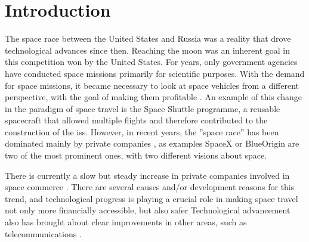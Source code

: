 
\chapter{Introduction}
\label{chapter:introduction}

The space race between the United States and Russia was a reality that drove technological advances since then. Reaching the moon was an inherent goal in this competition won by the United States. For years, only government agencies have conducted space missions primarily for scientific purposes. With the demand for space missions, it became necessary to look at space vehicles from a different perspective, with the goal of making them profitable \cite{gomes_road_2013}. An example of this change in the paradigm of space travel is the Space Shuttle programme, a reusable spacecraft that allowed multiple flights and therefore contributed to the construction of the \gls{iss}. However, in recent years, the ”space race” has been dominated mainly by private companies \cite{gomes_road_2013}, as examples SpaceX \cite{noauthor_spacex_nodate}  or BlueOrigin \cite{noauthor_blueorigin_nodate} are two of the most prominent ones, with two different visions about space.

There is currently a slow but steady increase in private companies involved in space commerce \cite{quinn_acceptable_nodate}. There are several causes and/or development reasons for this trend, and technological progress is playing a crucial role in making space travel not only more financially accessible, but also safer \cite{blue_l_2017} Technological advancement also has brought about clear improvements in other areas, such as telecommunications \cite{garzaniti_review_2021}.

